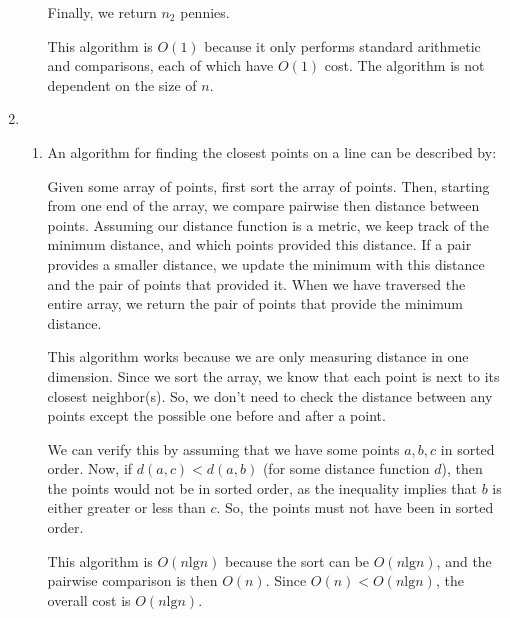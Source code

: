 \documentclass[12pt,letterpaper]{article}
\newcommand{\lb}[0]{\text{lg}}
\begin{document}
\begin{enumerate}
\begin{enumerate}
          Finally, we return $n_2$ pennies.

          This algorithm is $O(1)$ because it only performs standard arithmetic and comparisons, each of which have $O(1)$ cost.
          The algorithm is not dependent on the size of $n$.
      \end{enumerate}

    \item
      \begin{enumerate}
        \item An algorithm for finding the closest points on a line can be described by:

          Given some array of points, first sort the array of points.
          Then, starting from one end of the array, we compare pairwise then distance between points.
          Assuming our distance function is a metric, we keep track of the minimum distance, and which points provided this distance.
          If a pair provides a smaller distance, we update the minimum with this distance and the pair of points that provided it.
          When we have traversed the entire array, we return the pair of points that provide the minimum distance.

          This algorithm works because we are only measuring distance in one dimension.
          Since we sort the array, we know that each point is next to its closest neighbor(s).
          So, we don't need to check the distance between any points except the possible one before and after a point.

          We can verify this by assuming that we have some points $a, b, c$ in sorted order.
          Now, if $d(a, c) < d(a, b)$ (for some distance function $d$), then the points would not be in sorted order, as the inequality implies that $b$ is either greater or less than $c$. So, the points must not have been in sorted order.

          This algorithm is $O(n\lb{n})$ because the sort can be $O(n\lb{n})$, and the pairwise comparison is then $O(n)$.
          Since $O(n) < O(n\lb{n})$, the overall cost is $O(n\lb{n})$.
      \end{enumerate}
  \end{enumerate}
\end{document}
